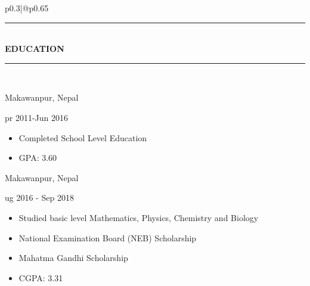 \documentclass[12pt,a4paper]{article}
\newcommand{\myline}[1]{\rule{#1}{1.0pt}\\}
\newcommand{\topic}[1]{\textbf{\Large\selectfont\MakeUppercase{#1}}\\\vspace{-0.5cm}\myline{1.0cm}}
\newcommand{\lsubtopic}[3]{
  \begin{minipage}[t]{0.7\linewidth}
    \textbf{\normalsize\selectfont{#1}}
  \end{minipage}
  \hfill
  \begin{minipage}[t]{0.25\linewidth}
    \raggedleft
    {#2\\}
  \end{minipage}
  \par
}
\begin{document}
\begin{multicols}{2}
\begin{tabular}{p{0.3\textwidth}|@{\hspace{5mm}}p{0.65\textwidth}}
{\begin{flushleft}
\begin{itemize}
    \end{itemize}
     \textcolor{gray!50}{\rule{\linewidth}{0.5pt}}\\
     
    \topic{education} %
    \lsubtopic{SLC, Shree Sharada Higher Secondary School}{Makawanpur, Nepal} 
    
       Apr 2011-Jun 2016
    \begin{itemize}
        \item Completed School Level Education
        \item GPA: 3.60
    \end{itemize}
  
\lsubtopic{+2 Science, Hetauda School of Management Secondary School}{Makawanpur, Nepal}

 Aug 2016 - Sep 2018
\begin{itemize}
    \item Studied basic level Mathematics, Physics, Chemistry and Biology
    \item National Examination Board (NEB) Scholarship
    \item Mahatma Gandhi Scholarship
    \item CGPA: 3.31
\end{itemize}

\end{flushleft}
}
\end{tabular}
\end{multicols}


\pagebreak
\end{document}
